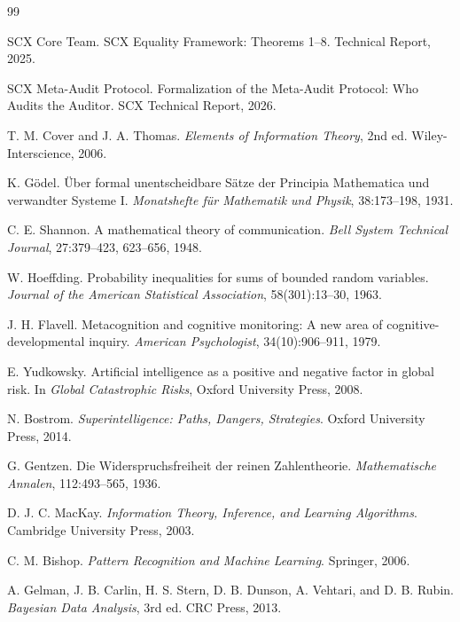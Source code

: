\documentclass[12pt,a4paper]{article}
\theoremstyle{definition}
\begin{document}
\begin{thebibliography}{99}

SCX Core Team.
\newblock SCX Equality Framework: Theorems 1--8.
\newblock Technical Report, 2025.

SCX Meta-Audit Protocol.
\newblock Formalization of the Meta-Audit Protocol: Who Audits the Auditor.
\newblock SCX Technical Report, 2026.

T. M. Cover and J. A. Thomas.
\newblock \textit{Elements of Information Theory}, 2nd ed.
\newblock Wiley-Interscience, 2006.

K. G\"{o}del.
\newblock \"{U}ber formal unentscheidbare S\"{a}tze der Principia Mathematica und verwandter Systeme I.
\newblock \textit{Monatshefte f\"{u}r Mathematik und Physik}, 38:173--198, 1931.

C. E. Shannon.
\newblock A mathematical theory of communication.
\newblock \textit{Bell System Technical Journal}, 27:379--423, 623--656, 1948.

W. Hoeffding.
\newblock Probability inequalities for sums of bounded random variables.
\newblock \textit{Journal of the American Statistical Association}, 58(301):13--30, 1963.

J. H. Flavell.
\newblock Metacognition and cognitive monitoring: A new area of cognitive-developmental inquiry.
\newblock \textit{American Psychologist}, 34(10):906--911, 1979.

E. Yudkowsky.
\newblock Artificial intelligence as a positive and negative factor in global risk.
\newblock In \textit{Global Catastrophic Risks}, Oxford University Press, 2008.

N. Bostrom.
\newblock \textit{Superintelligence: Paths, Dangers, Strategies}.
\newblock Oxford University Press, 2014.

G. Gentzen.
\newblock Die Widerspruchsfreiheit der reinen Zahlentheorie.
\newblock \textit{Mathematische Annalen}, 112:493--565, 1936.

D. J. C. MacKay.
\newblock \textit{Information Theory, Inference, and Learning Algorithms}.
\newblock Cambridge University Press, 2003.

C. M. Bishop.
\newblock \textit{Pattern Recognition and Machine Learning}.
\newblock Springer, 2006.

A. Gelman, J. B. Carlin, H. S. Stern, D. B. Dunson, A. Vehtari, and D. B. Rubin.
\newblock \textit{Bayesian Data Analysis}, 3rd ed.
\newblock CRC Press, 2013.


\end{thebibliography}
\end{document}
